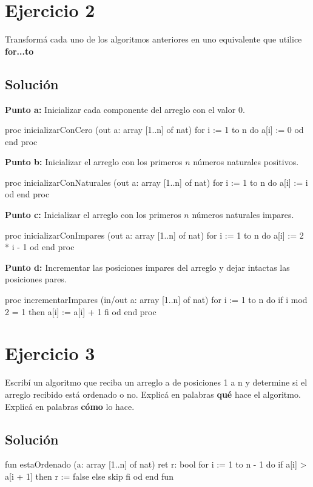 \documentclass{article}
\begin{document}
\section*{Ejercicio 2}
Transformá cada uno de los algoritmos anteriores en uno equivalente que utilice \textbf{for...to} 
\subsection*{Solución}
\textbf{Punto a:} Inicializar cada componente del arreglo con el valor $0$.
\begin{pascallike}
proc inicializarConCero (out a: array [1..n] of nat)
  for i := 1 to n do
    a[i] := 0
  od
end proc
\end{pascallike}

\textbf{Punto b:} Inicializar el arreglo con los primeros $n$ números naturales positivos.
\begin{pascallike}
proc inicializarConNaturales (out a: array [1..n] of nat)
  for i := 1 to n do
    a[i] := i
  od
end proc
\end{pascallike}

\textbf{Punto c:} Inicializar el arreglo con los primeros $n$ números naturales impares.
\begin{pascallike}
proc inicializarConImpares (out a: array [1..n] of nat)
  for i := 1 to n do
    a[i] := 2 * i - 1
  od
end proc
\end{pascallike}

\textbf{Punto d:} Incrementar las posiciones impares del arreglo y dejar intactas las posiciones pares.
\begin{pascallike}
proc incrementarImpares (in/out a: array [1..n] of nat)
  for i := 1 to n do
    if i mod 2 = 1 then
      a[i] := a[i] + 1
    fi
  od
end proc
\end{pascallike}

\newpage

\section*{Ejercicio 3}
Escribí un algoritmo que reciba un arreglo a de posiciones 1 a n y determine si el arreglo recibido
está ordenado o no. Explicá en palabras \textbf{qué} hace el algoritmo. Explicá en palabras \textbf{cómo} lo hace.

\subsection*{Solución}
\begin{pascallike}
fun estaOrdenado (a: array [1..n] of nat) ret r: bool
  for i := 1 to n - 1 do
    if a[i] > a[i + 1] then
      r := false
    else
      skip
    fi
  od
end fun
\end{pascallike}
\end{document}
